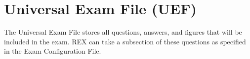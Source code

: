 \documentclass{article}
\begin{document}
\section{Universal Exam File (UEF)}
The Universal Exam File stores all questions, answers, and figures that will be
included in the exam. REX can take a subsection of these questions as specified
in the Exam Configuration File. 





\end{document}
